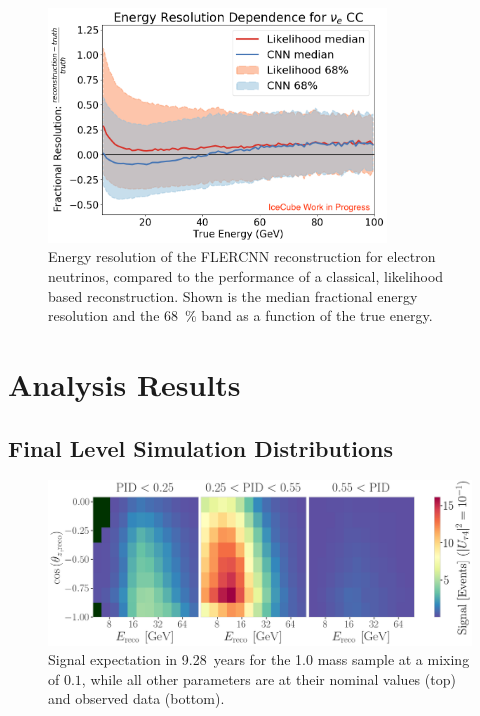 \begin{figure}[h]
    \includegraphics[width=0.8\textwidth]{figures/simulation_and_processing/flercnn/EnergyCNNResolution_NuECC_CompareLikelihoodReco.png}
	\caption[FLERCNN energy resolution for electron neutrinos]{Energy resolution of the FLERCNN reconstruction for electron neutrinos, compared to the performance of a classical, likelihood based reconstruction. Shown is the median fractional energy resolution and the \SI{68}{\percent} band as a function of the true energy.}
\end{figure}


\chapter{Analysis Results}

\section{Final Level Simulation Distributions} 

\begin{figure}[h]
    \includegraphics{figures/results/3d_histograms/signal_1.0_GeV_combined_U_tau4_sq_0.1000_total.png}
    \caption[Three-dimensional signal expectation]{Signal expectation in \SI{9.28}{years} for the \SI{1.0}{\gev} mass sample at a mixing of $0.1$, while all other parameters are at their nominal values (top) and observed data (bottom).}
\end{figure}


